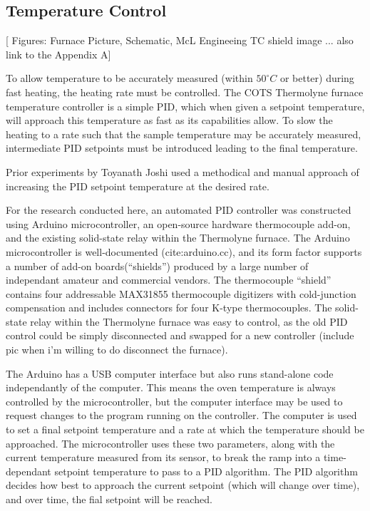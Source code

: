 
	\subsection{Temperature Control}

	[ Figures: Furnace Picture, Schematic, McL Engineeing TC shield image ... also link to the Appendix A]

	To allow temperature to be accurately measured (within $50^{\circ}C$ or better) during fast heating, the heating rate must be controlled.
	The COTS Thermolyne furnace temperature controller is a simple PID, which when given a setpoint temperature, will approach this temperature as fast as its capabilities allow.
	To slow the heating to a rate such that the sample temperature may be accurately measured, intermediate PID setpoints must be introduced leading to the final temperature.

	Prior experiments by Toyanath Joshi used a methodical and manual approach of increasing the PID setpoint temperature at the desired rate.
	
	For the research conducted here, an automated PID controller was constructed using Arduino microcontroller, an open-source hardware thermocouple add-on, and the existing solid-state relay within the Thermolyne furnace.  
	The Arduino microcontroller is well-documented (cite:arduino.cc), and its form factor supports a number of add-on boards(``shields'') produced by a large number of independant amateur and commercial vendors.
	The thermocouple ``shield'' contains four addressable MAX31855 thermocouple digitizers with cold-junction compensation and includes connectors for four K-type thermocouples.
	The solid-state relay within the Thermolyne furnace was easy to control, as the old PID control could be simply disconnected and swapped for a new controller (include pic when i'm willing to do disconnect the furnace).

	The Arduino has a USB computer interface but also runs stand-alone code independantly of the computer.
	This means the oven temperature is always controlled by the microcontroller, but the computer interface may be used to request changes to the program running on the controller.
	The computer is used to set a final setpoint temperature and a rate at which the temperature should be approached.  
	The microcontroller uses these two parameters, along with the current temperature measured from its sensor, to break the ramp into a time-dependant setpoint temperature to pass to a PID algorithm.
	The PID algorithm decides how best to approach the current setpoint (which will change over time), and over time, the fial setpoint will be reached.


